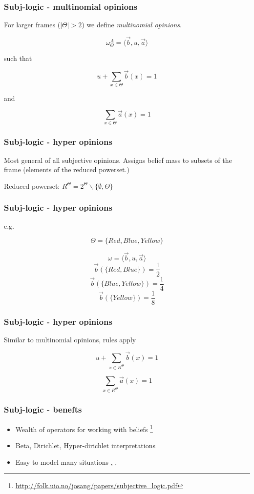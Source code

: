\documentclass{beamer}
\begin{document}
\begin{frame}
\frametitle{Subj-logic - multinomial opinions}

For larger frames ($|\Theta| > 2$) we define \emph{multinomial opinions}.

$$ \omega_\Theta^A = \langle \vec{b}, u, \vec{a} \rangle $$

such that

$$u + \sum_{x \in \Theta} \vec{b}(x) = 1$$

and

$$\sum_{x\in \Theta} \vec{a}(x) = 1$$

\end{frame}

\begin{frame}
\frametitle{Subj-logic - hyper opinions}

Most general of all subjective opinions. Assigns belief mass to subsets of the
frame (elements of the reduced powerset.)

Reduced powerset: $R^\Theta = 2^\Theta \backslash \lbrace \emptyset, \Theta \rbrace$

\end{frame}

\begin{frame}
\frametitle{Subj-logic - hyper opinions}

e.g.

$$\Theta = \lbrace Red, Blue, Yellow \rbrace$$

$$\omega = \langle \vec{b}, u, \vec{a} \rangle$$
$$\vec{b}\left(\lbrace Red, Blue \rbrace \right) = \frac{1}{2}$$
$$\vec{b}\left(\lbrace Blue, Yellow \rbrace \right) = \frac{1}{4}$$
$$\vec{b}\left(\lbrace Yellow \rbrace \right) = \frac{1}{8}$$

\end{frame}

\begin{frame}
\frametitle{Subj-logic - hyper opinions}

Similar to multinomial opinions, rules apply

$$u + \sum_{x \in R^\Theta} \vec{b}\left(x\right) = 1$$

$$\sum_{x \in R^\Theta} \vec{a}\left(x\right) = 1$$

\end{frame}

\begin{frame}
\frametitle{Subj-logic - benefts}

\begin{itemize}
  \item Wealth of operators for working with beliefs
     \footnote{\url{http://folk.uio.no/josang/papers/subjective_logic.pdf}}
  \item Beta, Dirichlet, Hyper-dirichlet interpretations
  \item Easy to model many situations
    \cite{josang2008conditional}, \cite{josang2006trust}, \cite{kent2010application}
\end{itemize}

\end{frame}
\end{document}

